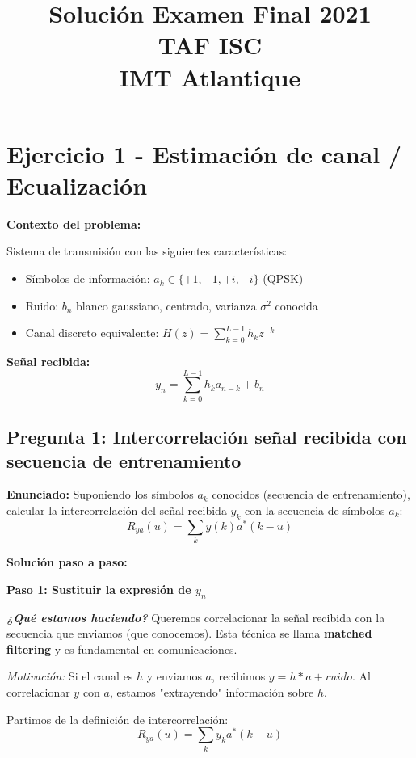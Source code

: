 \documentclass[11pt,a4paper]{article}
\title{\textbf{Soluci\'on Examen Final 2021\\TAF ISC\\IMT Atlantique}}
\author{}
\date{}
\begin{document}
\maketitle

\section*{Ejercicio 1 - Estimaci\'on de canal / Ecualizaci\'on}

\textbf{Contexto del problema:}

Sistema de transmisi\'on con las siguientes caracter\'isticas:
\begin{itemize}
    \item S\'imbolos de informaci\'on: $a_k \in \{+1, -1, +i, -i\}$ (QPSK)
    \item Ruido: $b_n$ blanco gaussiano, centrado, varianza $\sigma^2$ conocida
    \item Canal discreto equivalente: $H(z) = \sum_{k=0}^{L-1} h_k z^{-k}$
\end{itemize}

\textbf{Se\~nal recibida:}
\[
y_n = \sum_{k=0}^{L-1} h_k a_{n-k} + b_n
\]

\subsection*{Pregunta 1: Intercorrelaci\'on se\~nal recibida con secuencia de entrenamiento}

\textbf{Enunciado:} Suponiendo los s\'imbolos $a_k$ conocidos (secuencia de entrenamiento), calcular la intercorrelaci\'on del se\~nal recibida $y_k$ con la secuencia de s\'imbolos $a_k$:
\[
R_{ya}(u) = \sum_k y(k) a^*(k-u)
\]

\vspace{0.3cm}
\textbf{Soluci\'on paso a paso:}

\textbf{Paso 1: Sustituir la expresi\'on de $y_n$}

\textit{\textbf{¿Qu\'e estamos haciendo?}} Queremos correlacionar la se\~nal recibida con la secuencia que enviamos (que conocemos). Esta t\'ecnica se llama \textbf{matched filtering} y es fundamental en comunicaciones.

\textit{Motivaci\'on:} Si el canal es $h$ y enviamos $a$, recibimos $y = h * a + ruido$. Al correlacionar $y$ con $a$, estamos "extrayendo" informaci\'on sobre $h$.

Partimos de la definici\'on de intercorrelaci\'on:
\[
R_{ya}(u) = \sum_k y_k a^*(k-u)
\]
\end{document}
